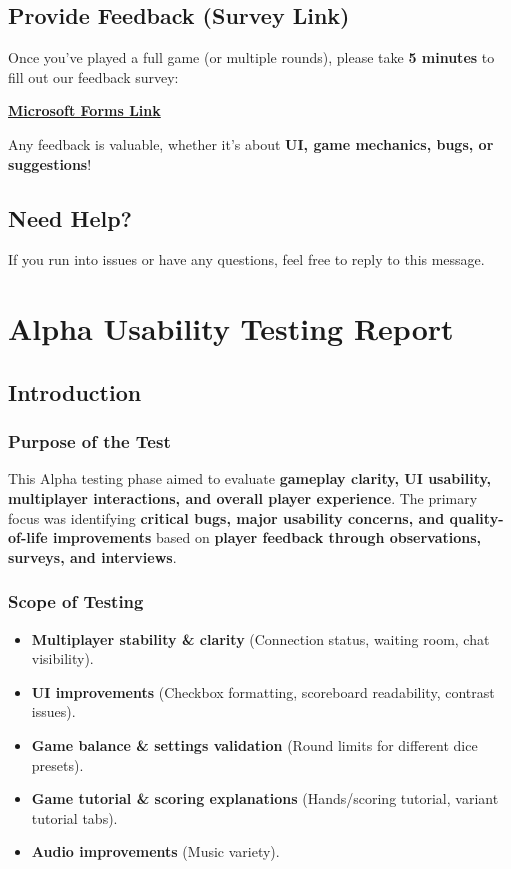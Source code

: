 \documentclass{article}
\begin{document}
\subsection{Provide Feedback (Survey Link)}

Once you’ve played a full game (or multiple rounds), please take \textbf{5 minutes} to fill out our feedback survey:

\href{https://forms.office.com/r/87fhfHWjjW}{\textbf{Microsoft Forms Link}}

Any feedback is valuable, whether it's about \textbf{UI, game mechanics, bugs, or suggestions}!

\subsection{Need Help?}
If you run into issues or have any questions, feel free to reply to this message.

\newpage

\section{Alpha Usability Testing Report}

\subsection{Introduction}
\subsubsection{Purpose of the Test}
This Alpha testing phase aimed to evaluate \textbf{gameplay clarity, UI usability, multiplayer interactions, and overall player experience}. The primary focus was identifying \textbf{critical bugs, major usability concerns, and quality-of-life improvements} based on \textbf{player feedback through observations, surveys, and interviews}.

\subsubsection{Scope of Testing}
\begin{itemize}
    \item \textbf{Multiplayer stability \& clarity} (Connection status, waiting room, chat visibility).
    \item \textbf{UI improvements} (Checkbox formatting, scoreboard readability, contrast issues).
    \item \textbf{Game balance \& settings validation} (Round limits for different dice presets).
    \item \textbf{Game tutorial \& scoring explanations} (Hands/scoring tutorial, variant tutorial tabs).
    \item \textbf{Audio improvements} (Music variety).
\end{itemize}
\end{document}
